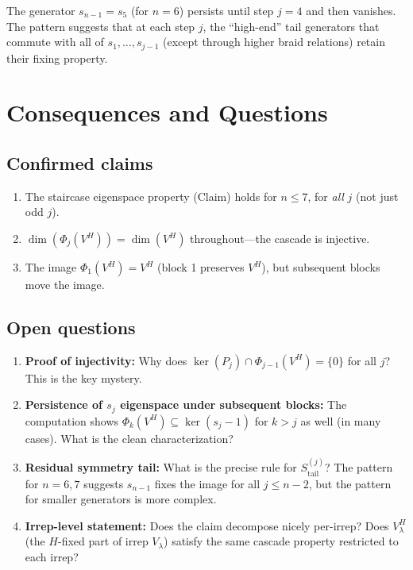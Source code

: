 \documentclass[12pt]{article}
\theoremstyle{definition}
\begin{document}
\noindent The generator $s_{n-1} = s_5$ (for $n=6$) persists until step $j=4$ and then vanishes. The pattern suggests that at each step $j$, the ``high-end'' tail generators that commute with all of $s_1, \ldots, s_{j-1}$ (except through higher braid relations) retain their fixing property.

\section{Consequences and Questions}

\subsection{Confirmed claims}
\begin{enumerate}
  \item The staircase eigenspace property (Claim) holds for $n \le 7$, for \emph{all} $j$ (not just odd $j$).
  \item $\dim(\Phi_j(V^H)) = \dim(V^H)$ throughout---the cascade is injective.
  \item The image $\Phi_1(V^H) = V^H$ (block 1 preserves $V^H$), but subsequent blocks move the image.
\end{enumerate}

\subsection{Open questions}
\begin{enumerate}
  \item \textbf{Proof of injectivity:} Why does $\ker(P_j) \cap \Phi_{j-1}(V^H) = \{0\}$ for all $j$? This is the key mystery.
  \item \textbf{Persistence of $s_j$ eigenspace under subsequent blocks:} The computation shows $\Phi_k(V^H) \subseteq \ker(s_j - 1)$ for $k > j$ as well (in many cases). What is the clean characterization?
  \item \textbf{Residual symmetry tail:} What is the precise rule for $S_{\text{tail}}^{(j)}$? The pattern for $n=6, 7$ suggests $s_{n-1}$ fixes the image for all $j \le n-2$, but the pattern for smaller generators is more complex.
  \item \textbf{Irrep-level statement:} Does the claim decompose nicely per-irrep? Does $V_\lambda^H$ (the $H$-fixed part of irrep $V_\lambda$) satisfy the same cascade property restricted to each irrep?
\end{enumerate}
\end{document}
